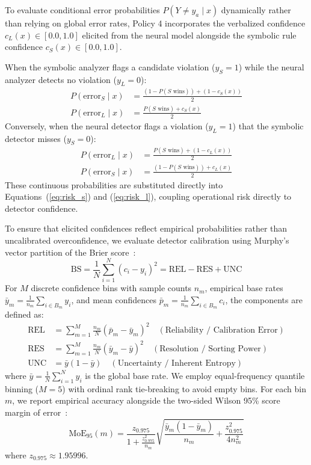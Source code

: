 To evaluate conditional error probabilities $P(Y \neq y_a \mid x)$ dynamically rather than relying on global error rates, Policy 4 incorporates the verbalized confidence $c_L(x) \in [0.0, 1.0]$ elicited from the neural model alongside the symbolic rule confidence $c_S(x) \in [0.0, 1.0]$.

When the symbolic analyzer flags a candidate violation ($y_S=1$) while the neural analyzer detects no violation ($y_L=0$):
\begin{align}
P(\text{error}_S \mid x) &= \frac{(1 - P(S \text{ wins})) + (1 - c_S(x))}{2} \\
P(\text{error}_L \mid x) &= \frac{P(S \text{ wins}) + c_S(x)}{2}
\end{align}
Conversely, when the neural detector flags a violation ($y_L=1$) that the symbolic detector misses ($y_S=0$):
\begin{align}
P(\text{error}_L \mid x) &= \frac{P(S \text{ wins}) + (1 - c_L(x))}{2} \\
P(\text{error}_S \mid x) &= \frac{(1 - P(S \text{ wins})) + c_L(x)}{2}
\end{align}
These continuous probabilities are substituted directly into Equations~(\ref{eq:risk_s}) and (\ref{eq:risk_l}), coupling operational risk directly to detector confidence.

To ensure that elicited confidences reflect empirical probabilities rather than uncalibrated overconfidence, we evaluate detector calibration using Murphy's vector partition of the Brier score~\cite{murphy1973new}:
\begin{equation}
\text{BS} = \frac{1}{N} \sum_{i=1}^N (c_i - y_i)^2 = \text{REL} - \text{RES} + \text{UNC}
\end{equation}
For $M$ discrete confidence bins with sample counts $n_m$, empirical base rates $\bar{y}_m = \frac{1}{n_m} \sum_{i \in B_m} y_i$, and mean confidences $\bar{p}_m = \frac{1}{n_m} \sum_{i \in B_m} c_i$, the components are defined as:
\begin{align}
\text{REL} &= \sum_{m=1}^M \frac{n_m}{N} (\bar{p}_m - \bar{y}_m)^2 \quad (\text{Reliability / Calibration Error}) \\
\text{RES} &= \sum_{m=1}^M \frac{n_m}{N} (\bar{y}_m - \bar{y})^2 \quad (\text{Resolution / Sorting Power}) \\
\text{UNC} &= \bar{y}(1 - \bar{y}) \quad (\text{Uncertainty / Inherent Entropy})
\end{align}
where $\bar{y} = \frac{1}{N} \sum_{i=1}^N y_i$ is the global base rate. We employ equal-frequency quantile binning ($M=5$) with ordinal rank tie-breaking to avoid empty bins. For each bin $m$, we report empirical accuracy alongside the two-sided Wilson 95\% score margin of error~\cite{murphy1973new}:
\begin{equation}
\text{MoE}_{95}(m) = \frac{z_{0.975}}{1 + \frac{z_{0.975}^2}{n_m}} \sqrt{\frac{\bar{y}_m(1 - \bar{y}_m)}{n_m} + \frac{z_{0.975}^2}{4 n_m^2}}
\end{equation}
where $z_{0.975} \approx 1.95996$.


